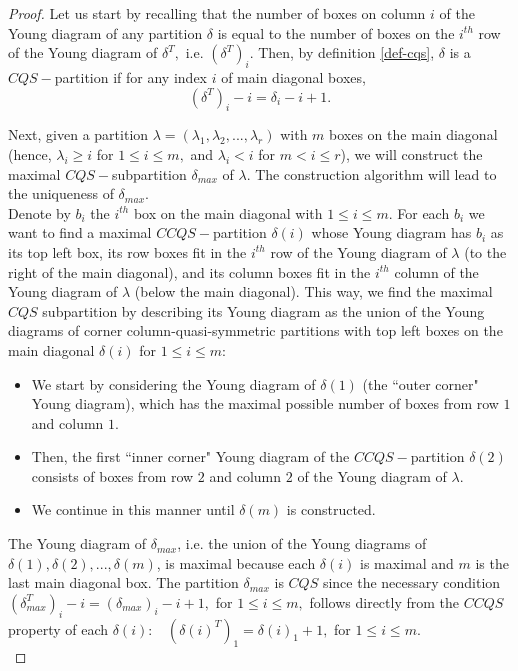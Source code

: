 \documentclass[main.tex]{subfiles}
\begin{document}
\begin{proof}
    Let us start by recalling  that the number of boxes on column $i$ of the Young diagram of any partition $\delta$ is equal to the number of boxes on the $i^{th}$ row of the Young diagram of $\delta^T,$ i.e. $(\delta^T)_i$.
    Then, by definition \ref{def-cqs}, $\delta$ is a $CQS-$partition if for any index $i$ of main diagonal boxes, $$(\delta^T)_i-i=\delta_i-i+1.$$

    Next, given a partition $\lambda = (\lambda_1, \lambda_2, ..., \lambda_r)$ with $m$ boxes on the main diagonal (hence, $\lambda_i\geq i $ for $1\leq i\leq m,$ and $\lambda_i < i $ for $m <i\leq r$), we will construct the maximal $CQS-$subpartition $\delta_{max}$ of $\lambda$. The construction algorithm will lead to the uniqueness of $\delta_{max}$. \\
    
    
    Denote by $b_i$ the $i^{th}$ box on the main diagonal with $1\leq i\leq m.$ For each $b_i$ we want to find a maximal $CCQS-$partition $\delta(i)$ whose Young diagram has $b_i$ as its top left box, its row boxes fit in the $i^{th}$ row of the Young diagram of $\lambda$ (to the right of the main diagonal), and its column boxes fit in the $i^{th}$ column of the Young diagram of $\lambda$ (below the main diagonal). This way, we find the maximal $CQS$ subpartition by describing its Young diagram as the union of the Young diagrams of corner column-quasi-symmetric partitions with top left boxes on the main diagonal $\delta(i)$ for $1\leq i\leq m$: 
    \begin{itemize}
        \item We start by considering the Young diagram of $\delta(1)$ (the ``outer corner" Young diagram), which has the maximal possible number of boxes from row $1$ and column $1.$
        \item Then, the first ``inner corner" Young diagram of the $CCQS-$partition $\delta(2)$ consists of boxes from row $2$ and column $2$ of the Young diagram of $\lambda$. 
        \item We continue in this manner until $\delta(m)$ is constructed.
    \end{itemize}
    
      The Young diagram of $\delta_{max}$, i.e. the union of the Young diagrams of $\delta(1), \delta(2),..., \delta(m)$, is maximal because each $\delta(i)$ is maximal and $m$ is the last main diagonal box. The partition $\delta_{max}$ is $CQS$ since the necessary condition $(\delta_{max}^T)_i-i=(\delta_{max})_i-i+1, $ for $1\leq i\leq m,$ follows directly from the $CCQS$ property of each $\delta(i):$ $\;\; (\delta(i)^T)_1 = \delta(i)_1+1, $ for $1\leq i\leq m.$\\


\end{proof}
\end{document}
